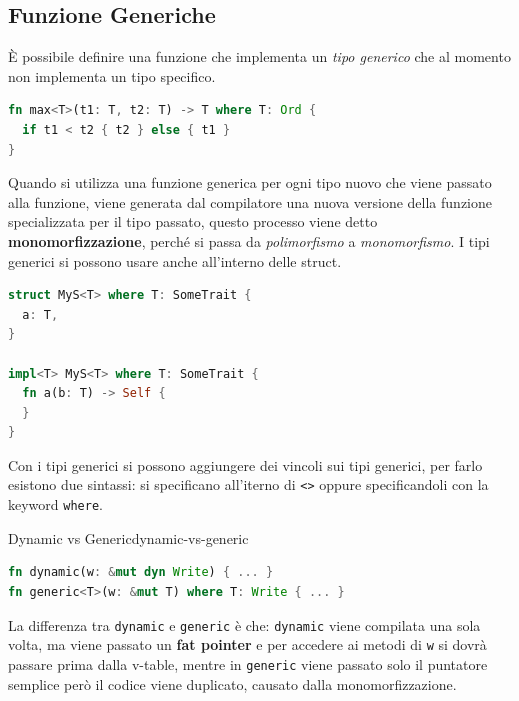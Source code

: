 \documentclass[12pt]{article}
\begin{document}
\subsection{Funzione Generiche}
\`E possibile definire una funzione che implementa un \emph{tipo generico} che al momento non implementa un tipo specifico.
\begin{lstlisting}[language=rust]
fn max<T>(t1: T, t2: T) -> T where T: Ord {
  if t1 < t2 { t2 } else { t1 }
}
\end{lstlisting}
Quando si utilizza una funzione generica per ogni tipo nuovo che viene passato alla funzione, viene generata dal compilatore una nuova versione della funzione specializzata per il tipo passato, questo processo viene detto \textbf{monomorfizzazione}, perch\'e si passa da \emph{polimorfismo} a \emph{monomorfismo}. I tipi generici si possono usare anche all'interno delle struct.
\begin{lstlisting}[language=rust]
struct MyS<T> where T: SomeTrait {
  a: T,
}

impl<T> MyS<T> where T: SomeTrait {
  fn a(b: T) -> Self {
  }
}
\end{lstlisting}
Con i tipi generici si possono aggiungere dei vincoli sui tipi generici, per farlo esistono due sintassi: si specificano all'iterno di \texttt{<>} oppure specificandoli con la keyword \texttt{where}.
\begin{example}{Dynamic vs Generic}{dynamic-vs-generic}
  \begin{lstlisting}[language=rust]
fn dynamic(w: &mut dyn Write) { ... }
fn generic<T>(w: &mut T) where T: Write { ... }
  \end{lstlisting}
  La differenza tra \texttt{dynamic} e \texttt{generic} \`e che: \texttt{dynamic} viene compilata una sola volta, ma viene passato un \textbf{fat pointer} e per accedere ai metodi di \texttt{w} si dovr\`a passare prima dalla v-table, mentre in \texttt{generic} viene passato solo il puntatore semplice per\`o il codice viene duplicato, causato dalla monomorfizzazione.
\end{example}
\end{document}
